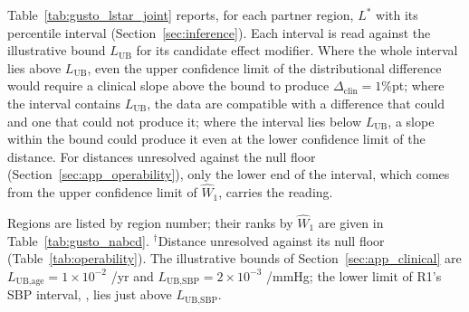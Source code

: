 \documentclass[AMA,Times1COL]{WileyNJDv5}
\begin{document}
Table~\ref{tab:gusto_lstar_joint} reports, for each partner region, $L^*$ with its percentile interval (Section~\ref{sec:inference}). Each interval is read against the illustrative bound $L_{\text{UB}}$ for its candidate effect modifier. Where the whole interval lies above $L_{\text{UB}}$, even the upper confidence limit of the distributional difference would require a clinical slope above the bound to produce $\Delta_{\text{clin}} = 1$\%pt; where the interval contains $L_{\text{UB}}$, the data are compatible with a difference that could and one that could not produce it; where the interval lies below $L_{\text{UB}}$, a slope within the bound could produce it even at the lower confidence limit of the distance. For distances unresolved against the null floor (Section~\ref{sec:app_operability}), only the lower end of the interval, which comes from the upper confidence limit of $\widehat{W}_1$, carries the reading.

\begin{table}[ht]
\centering
\caption{$L^*$ at $\Delta_{\text{clin}} = 1$\%pt with 95\% percentile interval for all 15 partner regions, listed by region number. $L^*$ is the minimum clinical slope (per year for age, per mmHg for SBP) required for the observed distributional difference to produce a treatment effect difference of $1$\%pt on the absolute 30-day mortality scale.\label{tab:gusto_lstar_joint}}
\begin{tablenotes}
\item Regions are listed by region number; their ranks by $\widehat{W}_1$ are given in Table~\ref{tab:gusto_nabcd}. $^\dagger$Distance unresolved against its null floor (Table~\ref{tab:operability}). The illustrative bounds of Section~\ref{sec:app_clinical} are $L_{\text{UB,age}} = 1\times10^{-2}$ /yr and $L_{\text{UB,SBP}} = 2\times10^{-3}$ /mmHg; the lower limit of R1's SBP interval, , lies just above $L_{\text{UB,SBP}}$.
\end{tablenotes}
\end{table}
\end{document}

